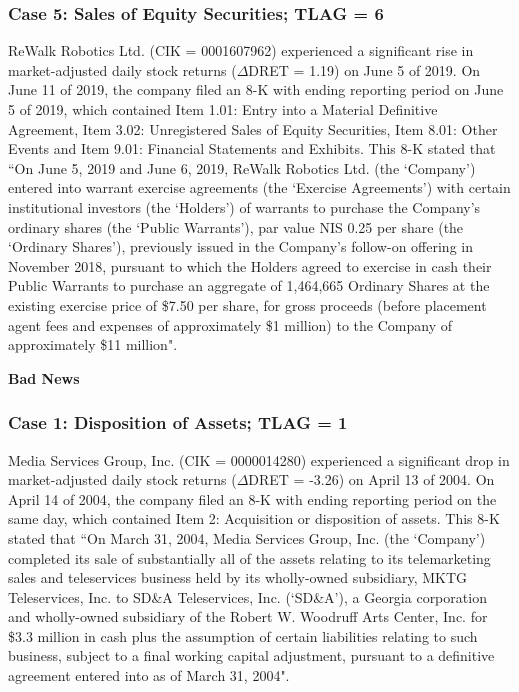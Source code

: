 \begin{small}
\subsubsection*{Case 5: Sales of Equity Securities; TLAG = 6}
ReWalk Robotics Ltd. (CIK = 0001607962) experienced a significant rise in market-adjusted daily stock returns ($\Delta$DRET = 1.19) on June 5 of 2019. On June 11 of 2019, the company filed an 8-K with ending reporting period on June 5 of 2019, which contained Item 1.01: Entry into a Material Definitive Agreement, Item 3.02: Unregistered Sales of Equity Securities, Item 8.01: Other Events and Item 9.01: Financial Statements and Exhibits. This 8-K stated that ``On June 5, 2019  and June 6, 2019, ReWalk Robotics Ltd. (the `Company') entered into warrant exercise agreements (the `Exercise Agreements') with certain institutional investors (the `Holders') of warrants to purchase the Company’s ordinary shares (the `Public Warrants'), par value NIS 0.25 per share (the `Ordinary Shares'), previously issued in the Company’s follow-on offering in November 2018, pursuant to which the Holders agreed to exercise in cash their Public Warrants to purchase an aggregate of 1,464,665 Ordinary Shares at the existing exercise price of \$7.50 per share, for gross proceeds (before placement agent fees and expenses of approximately \$1 million) to the Company of approximately \$11 million".

\newpage
\begin{center}
	\textbf{Bad News}
\end{center}
\subsubsection*{Case 1: Disposition of Assets; TLAG = 1}
Media Services Group, Inc. (CIK = 0000014280) experienced a significant drop in market-adjusted daily stock returns ($\Delta$DRET = -3.26) on April 13 of 2004. On April 14 of 2004, the company filed an 8-K with ending reporting period on the same day, which contained Item 2: Acquisition or disposition of assets. This 8-K stated that ``On March 31, 2004, Media Services Group, Inc. (the `Company') completed its sale of substantially all of the assets relating to its telemarketing sales and teleservices business held by its wholly-owned subsidiary, MKTG Teleservices, Inc. to SD\&A Teleservices, Inc. (`SD\&A'), a Georgia corporation and wholly-owned
subsidiary of the Robert W. Woodruff Arts Center, Inc. for \$3.3 million in cash plus the assumption of certain liabilities relating to such business, subject to
a final working capital adjustment, pursuant to a definitive agreement entered into as of March 31, 2004".

\end{small}
